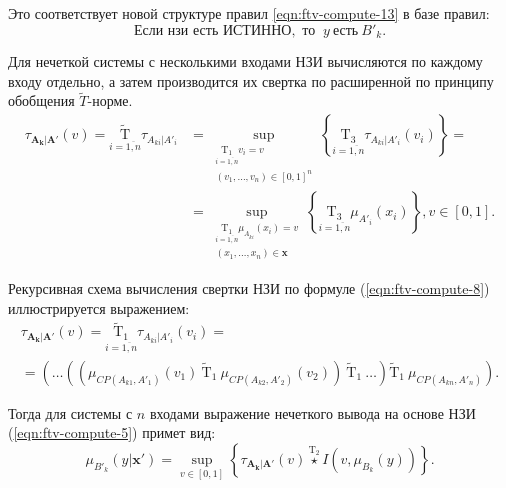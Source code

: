 Это соответствует новой структуре правил \eqref{eqn:ftv-compute-13} в базе правил:
\begin{equation}
	\label{eqn:ftv-compute-13}
	\text{Если } \textit{нзи} \text{ есть } \text{ИСТИННО}, \text{ то }\ y\ \text{есть}\ B'_k.
\end{equation}

Для нечеткой системы с несколькими входами НЗИ вычисляются по каждому входу отдельно, а затем производится их свертка по расширенной по принципу обобщения $\tilde{T}$-норме.
\begin{equation}
	\label{eqn:ftv-compute-8}
	\begin{split}
	\tau_{\mathbf{A_k}|\mathbf{A'}}(v) = \underset{i=\overline{1,n}}{\mathrm{\tilde{T}}} \tau_{A_{ki}|A'_i} &= \sup_{\substack{\underset{i=\overline{1,n}}{\mathrm{T_1}}v_i = v \\ (v_1, \dots, v_n) \in [0, 1]^n}} \left\{\underset{i=\overline{1,n}}{\mathrm{T_3}}\tau_{A_{ki}|A'_i}(v_i)\right\} = \\
	&= \sup_{\substack{\underset{i=\overline{1,n}}{\mathrm{T_1}}\mu_{A_{ki}}(x_i)=v \\ (x_1, \dots, x_n) \in \mathbf{x}}} \left\{ \underset{i=\overline{1,n}}{\mathrm{T_3}} \mu_{A'_i}(x_i) \right\}, v \in [0, 1].
	\end{split}
\end{equation}

Рекурсивная схема вычисления свертки НЗИ по формуле (\ref{eqn:ftv-compute-8}) иллюстрируется выражением:
 \begin{equation}
	\label{eqn:ftv-compute-10}
	\begin{gathered}
	\tau_{\mathbf{A_k}|\mathbf{A'}}(v) = \underset{i=\overline{1,n}}{\mathrm{\tilde{T}_1}}\tau_{A_{ki}|A'_i}(v_i) = \\
	= \left(\dots\left(\left(\mu_{CP(A_{k1}, A'_1)}(v_1)\ \mathrm{\tilde{T}_1}\ \mu_{CP(A_{k2}, A'_2)}(v_2)\right)\ \mathrm{\tilde{T}_1}\ \dots \right) \mathrm{\tilde{T}_1}\ \mu_{CP(A_{kn}, A'_n)}\right).
	\end{gathered}
\end{equation}

Тогда для системы с $n$ входами выражение нечеткого вывода на основе НЗИ (\ref{eqn:ftv-compute-5}) примет вид:
\begin{equation}
	\label{eqn:ftv-compute-11}
	\mu_{B'_k}(y|\mathbf{x'}) = \sup_{v \in [0, 1]} \left\{\tau_{\mathbf{A_k}|\mathbf{A'}}(v) \overset{\mathrm{T_2}}{\star} I(v, \mu_{B_k}(y))\right\}.
\end{equation}

